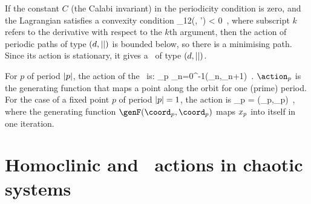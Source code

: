 If the constant $C$ (the
{Calabi invariant}) in the periodicity condition
 is zero, and the Lagrangian satisfies a convexity
condition
\beq
\genF_{12}(\coord, \coord') < 0
\,,
where subscript $k$ refers to the derivative with respect to the $k$th
argument, then the action of periodic paths of type  $(d,{||})$ is bounded below,
so there is a minimising path. Since its action is stationary, it gives a \po\
of type  $(d,{||})$.

For {\orbit} ${p}$  of period ${|p|}$, the {action} of the \orbit\ is:
\beq
\label{eq:DefGenFprimePOs}
\action_{p}  \equiv \sum_{n=0}^{-1}\genF(\coord_{n},\coord_{n+1})\ .
\eeq
$\action_{p}$ is the generating function that maps a point along the orbit for one
(prime) period.  For the case of a fixed point $p$ of period ${|p|}=1$,
the action is
\beq\label{eq:Definition generating function fixed points}
\action_{p}  = \genF(\coord_p,\coord_p)
\,,
\eeq
where the generating function $\genF(\coord_p,\coord_p)$ maps $x_p$ into itself in one
iteration.

\section{Homoclinic and \po\ actions in chaotic systems}

